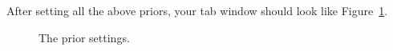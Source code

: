 {    After setting all the above priors, your  tab window should
    look like Figure~\ref{fig:beautiPriors}.

    \begin{figure}[htbp]
        \centering
        \caption{The prior settings.}
        \label{fig:beautiPriors}
    \end{figure}
}

